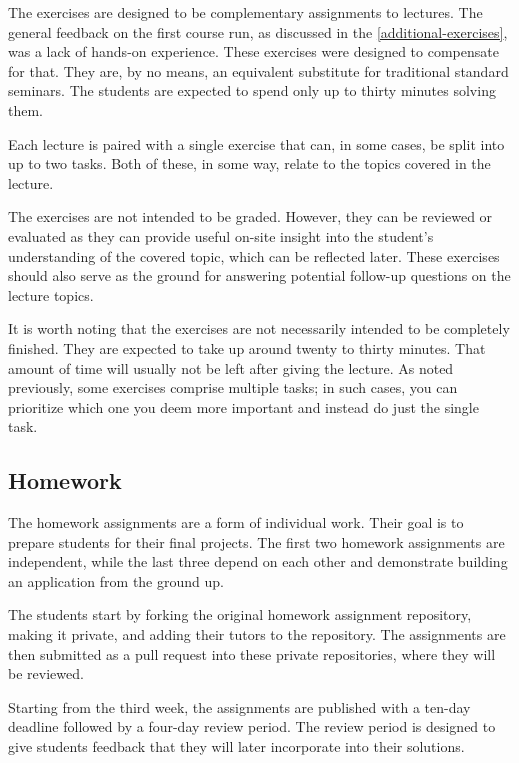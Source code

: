 \documentclass[
  digital,
  color,
  oneside,
  nosansbold,
  nocolorbold,
  nolof,
  nolot,
]{fithesis4}
\begin{document}
The exercises are designed to be complementary assignments to lectures. The general feedback on the first course run, as discussed in the \cref{additional-exercises}, was a lack of hands-on experience. These exercises were designed to compensate for that. They are, by no means, an equivalent substitute for traditional standard seminars. The students are expected to spend only up to thirty minutes solving them.

Each lecture is paired with a single exercise that can, in some cases, be split into up to two tasks. Both of these, in some way, relate to the topics covered in the lecture.

The exercises are not intended to be graded. However, they can be reviewed or evaluated as they can provide useful on-site insight into the student's understanding of the covered topic, which can be reflected later. These exercises should also serve as the ground for answering potential follow-up questions on the lecture topics.

It is worth noting that the exercises are not necessarily intended to be completely finished. They are expected to take up around twenty to thirty minutes. That amount of time will usually not be left after giving the lecture. As noted previously, some exercises comprise multiple tasks; in such cases, you can prioritize which one you deem more important and instead do just the single task.

\subsection{Homework}\label{design-homework}

The homework assignments are a form of individual work. Their goal is to prepare students for their final projects. The first two homework assignments are independent, while the last three depend on each other and demonstrate building an application from the ground up.

The students start by forking the original homework assignment repository, making it private, and adding their tutors to the repository. The assignments are then submitted as a pull request into these private repositories, where they will be reviewed.

Starting from the third week, the assignments are published with a ten-day deadline followed by a four-day review period. The review period is designed to give students feedback that they will later incorporate into their solutions.
\end{document}
